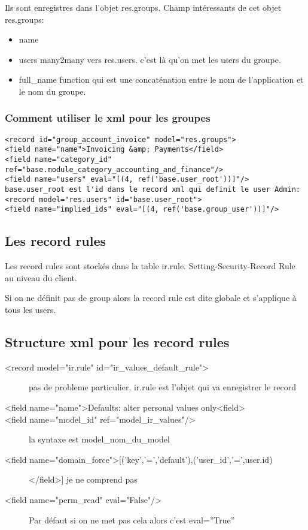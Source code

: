 \documentclass[12pt,a4paper]{article}
\begin{document}
Ils sont enregistres dans l'objet res.groups. 
Champ intéressants de cet objet res.groups: 
\begin{itemize}
\item name
\item users many2many vers res.users. c'est là qu'on met les users du groupe. 
\item full\_name function qui est une concaténation entre le nom de l'application et le nom du groupe.
\end{itemize}

\subsubsection{Comment utiliser le xml pour les groupes}
\label{sec:xml_groupe}

\begin{verbatim}
<record id="group_account_invoice" model="res.groups">
<field name="name">Invoicing &amp; Payments</field>
<field name="category_id" ref="base.module_category_accounting_and_finance"/> 
<field name="users" eval="[(4, ref('base.user_root'))]"/> base.user_root est l'id dans le record xml qui definit le user Admin: <record model="res.users" id="base.user_root">
<field name="implied_ids" eval="[(4, ref('base.group_user'))]"/>
\end{verbatim}
\subsection{Les record rules}
\label{sec:record_rule}

Les record rules sont stockés dans la table ir.rule. 
Setting-Security-Record Rule au niveau du client.

Si on ne définit pas de group alors la record rule est dite globale et s'applique à tous les users.

\subsection{Structure xml pour les record rules}
\label{sec:record_rules}
\begin{description}
  \item[<record model="ir.rule" id="ir\_values\_default\_rule">]  pas de probleme particulier. ir.rule est l'objet qui va enregistrer le record
\item[<field name="name">Defaults: alter personal values only<\/field>]
  \item[<field name="model\_id" ref="model\_ir\_values"/>]  la syntaxe est model\_nom\_du\_model
\item[<field name="domain\_force">[('key','=','default'),('user\_id','=',user.id)]</field>] je ne comprend pas
  \item[<field name="perm\_read" eval="False"/>] Par défaut si on ne met pas cela alors c'est eval=''True''
\end{description}
\end{document}
